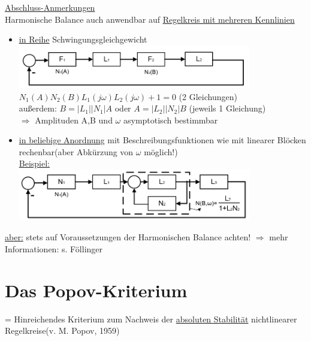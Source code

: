 \documentclass[openany,a4paper,11pt]{book}
\begin{document}
\uline{Abschluss-Anmerkungen}\\
Harmonische Balance auch anwendbar auf \uline{Regelkreis mit mehreren Kennlinien}
\begin{itemize}
    \item \uline{in Reihe} Schwingungsgleichgewicht\\
    \includegraphics[width=4in]{imgs/NLR64.png}\\
    $N_1(A)N_2(B)L_1(j\omega)L_2(j\omega)+1=0$  (2 Gleichungen)\\
    außerdem: $B=|L_1||N_1|A$ oder $A=|L_2||N_2|B$ (jeweils 1 Gleichung)\\
    $\Rightarrow$ Amplituden A,B und $\omega$ asymptotisch bestimmbar
    \item \uline{in beliebige Anordnung} mit Beschreibungsfunktionen wie mit linearer Blöcken rechenbar(aber Abkürzung von $\omega$ möglich!)\\
    \uline{Beispiel:}\\
    \includegraphics[width=4in]{imgs/NLR65.png}
\end{itemize}
\uline{aber:} stets auf Voraussetzungen der Harmonischen Balance achten! $\Rightarrow$ mehr Informationen: s. Föllinger
\chapter{Das Popov-Kriterium}
= Hinreichendes Kriterium zum Nachweis der \uline{absoluten Stabilität} nichtlinearer Regelkreise(v. M. Popov, 1959)
\end{document}
